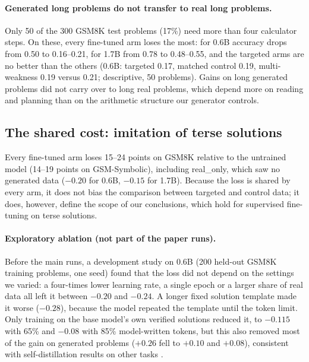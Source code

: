 \documentclass[11pt]{article}
\begin{document}
\paragraph{Generated long problems do not transfer to real long problems.}
Only 50 of the 300 GSM8K test problems (17\%) need more than four calculator steps. On these, every fine-tuned arm loses
the most: for 0.6B accuracy drops from 0.50 to 0.16--0.21, for 1.7B from 0.78 to 0.48--0.55, and the targeted arms are
no better than the others (0.6B: targeted 0.17, matched control 0.19, multi-weakness 0.19 versus 0.21; descriptive, 50
problems). Gains on long generated problems did not carry over to long real problems, which depend more on reading and
planning than on the arithmetic structure our generator controls.

\subsection{The shared cost: imitation of terse solutions}
\label{sec:cost}
Every fine-tuned arm loses 15--24 points on GSM8K relative to the untrained model (14--19 points on GSM-Symbolic),
including real\_only, which saw no generated data ($-0.20$ for 0.6B, $-0.15$ for 1.7B). Because the loss is shared by
every arm, it does not bias the comparison between targeted and control data; it does, however, define the scope of
our conclusions, which hold for supervised fine-tuning on terse solutions.

\paragraph{Exploratory ablation (not part of the paper runs).} Before the main runs, a development study on 0.6B (200
held-out GSM8K training problems, one seed) found that the loss did not depend on the settings we varied: a four-times
lower learning rate, a single epoch or a larger
share of real data all left it between $-0.20$ and $-0.24$. A longer fixed solution template made it worse ($-0.28$),
because the model repeated the template until the token limit. Only training on the base model's own verified solutions
reduced it, to $-0.115$ with 65\% and $-0.08$ with 85\% model-written tokens, but this also removed most of the gain on
generated problems ($+0.26$ fell to $+0.10$ and $+0.08$), consistent with self-distillation results on other tasks
\citep{yang2024sdft}.
\end{document}
